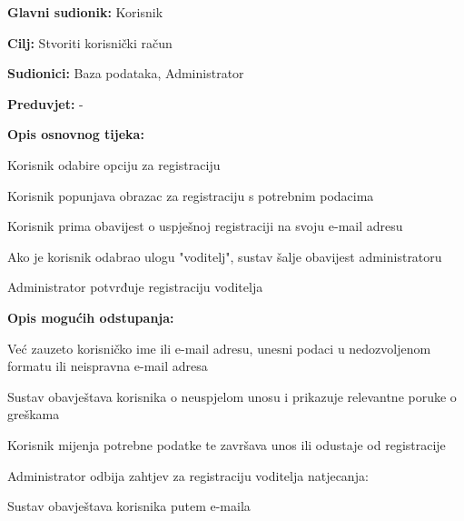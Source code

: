 					
					\noindent {}
					\begin{packed_item}
						
						\item \textbf{Glavni sudionik: }Korisnik
						\item  \textbf{Cilj:} Stvoriti korisnički račun
						\item  \textbf{Sudionici:} Baza podataka, Administrator 
						\item  \textbf{Preduvjet:} -
						\item  \textbf{Opis osnovnog tijeka:}
						
						\item[] \begin{packed_enum}
							
							\item Korisnik odabire opciju za registraciju 
							\item Korisnik popunjava obrazac za registraciju s potrebnim podacima 
							\item Korisnik prima obavijest o uspješnoj registraciji na svoju e-mail adresu 
							\item Ako je korisnik odabrao ulogu "voditelj", sustav šalje obavijest administratoru 
							\item Administrator potvrđuje registraciju voditelja 
						\end{packed_enum}
						
						\item  \textbf{Opis mogućih odstupanja:}
						\item[] \begin{packed_item}
							
							\item[2.a] Već zauzeto korisničko ime ili e-mail adresu, unesni podaci u nedozvoljenom formatu ili neispravna e-mail adresa 
							\item[] \begin{packed_enum}
								
								\item Sustav obavještava korisnika o neuspjelom unosu i prikazuje relevantne poruke o greškama 
								\item Korisnik mijenja potrebne podatke te završava unos ili odustaje od registracije 
								
							\end{packed_enum}
							
							\item[5.a] Administrator odbija zahtjev za registraciju voditelja natjecanja:
							\item[] \begin{packed_enum}
								
								\item Sustav obavještava korisnika putem e-maila
								
							\end{packed_enum}
						\end{packed_item}
					\end{packed_item}
					
